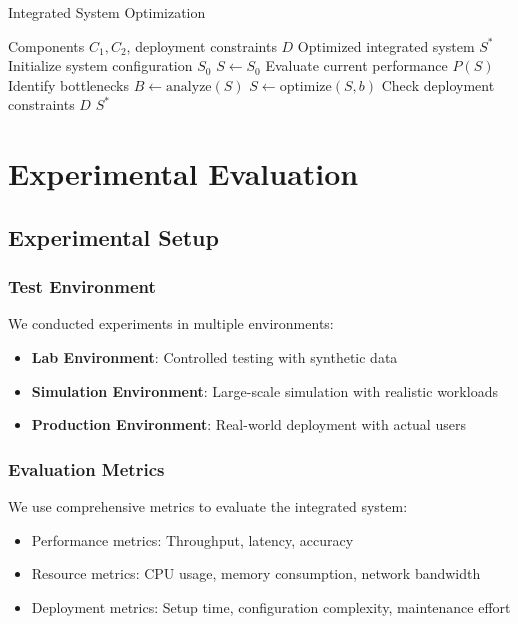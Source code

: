 \begin{algorithm}
\caption{Integrated System Optimization}
\label{alg:paperthree-optimization}
\begin{algorithmic}[1]
\Require Components $C_1, C_2$, deployment constraints $D$
\Ensure Optimized integrated system $S^*$
\State Initialize system configuration $S_0$
\State $S \gets S_0$
    \State Evaluate current performance $P(S)$
    \State Identify bottlenecks $B \gets \text{analyze}(S)$
        \State $S \gets \text{optimize}(S, b)$
    \EndFor
    \State Check deployment constraints $D$
\EndWhile
\State \Return $S^*$
\end{algorithmic}
\end{algorithm}

\section{Experimental Evaluation}

\subsection{Experimental Setup}

\subsubsection{Test Environment}
We conducted experiments in multiple environments:
\begin{itemize}
    \item \textbf{Lab Environment}: Controlled testing with synthetic data
    \item \textbf{Simulation Environment}: Large-scale simulation with realistic workloads
    \item \textbf{Production Environment}: Real-world deployment with actual users
\end{itemize}

\subsubsection{Evaluation Metrics}
We use comprehensive metrics to evaluate the integrated system:
\begin{itemize}
    \item Performance metrics: Throughput, latency, accuracy
    \item Resource metrics: CPU usage, memory consumption, network bandwidth
    \item Deployment metrics: Setup time, configuration complexity, maintenance effort
\end{itemize}

